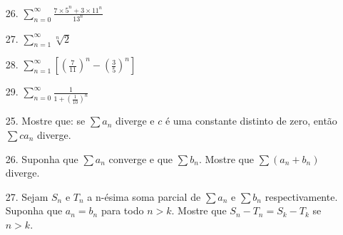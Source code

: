 \documentclass[oneside,a4paper,12pt]{article}
\begin{document}
\begin{multicols}{2}
\begin{itemize}
\end{itemize}
\begin{itemize}
	\item [26.] $\sum_{n=0}^{\infty}\frac{7\times 5^{n}+3\times11^{n}}{13^{n}}$
\end{itemize}
\begin{itemize}
	\item [27.] $\sum_{n=1}^{\infty}\sqrt[n]{2}$
\end{itemize}
\begin{itemize}
	\item [28.] $\sum_{n=1}^{\infty} \left[ (\frac{7}{11})^{n}-(\frac{3}{5})^{n}\right] $
\end{itemize}
\begin{itemize}
	\item [29.] $\sum_{n=0}^{\infty}\frac{1}{1+(\frac{1}{10})^{n}}$
\end{itemize}
\begin{itemize}
	\item [25.] Mostre que: se $\sum a_{n}$ diverge e $c$ é uma constante distinto de zero, então $\sum ca_{n}$ diverge.
\end{itemize}
\begin{itemize}
	\item [26.] Suponha que $\sum a_{n}$ converge e que $\sum b_{n}$. Mostre que $\sum (a_{n}+b_{n})$ diverge.
\end{itemize}
\begin{itemize}
	\item [27.] Sejam $S_{n}$ e $T_{n}$ a n-ésima soma parcial de $\sum a_{n}$ e $\sum b_{n}$ respectivamente. Suponha que $a_{n}=b_{n}$ para todo $n>k$. Mostre que $S_{n}-T_{n}=S_{k}-T_{k}$ se $n>k$. 
\end{itemize}
\end{multicols}    
\end{document}
